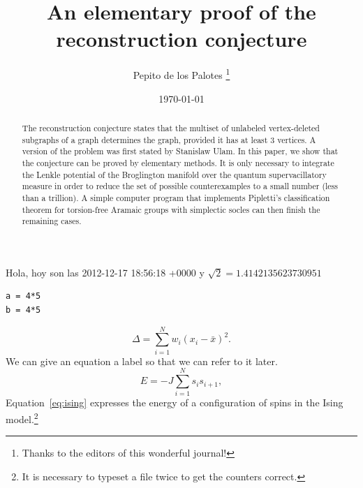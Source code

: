 \documentclass[12pt]{article}
\title{An elementary proof of the reconstruction conjecture}
\author{
Pepito de los Palotes
\thanks{Thanks to the editors of this wonderful journal!}
\\
}
\date{
\today
}
\begin{document}
\maketitle
\begin{abstract}
 The reconstruction conjecture states that the multiset of unlabeled
    vertex-deleted subgraphs of a graph determines the graph, provided it
    has at least 3 vertices.  A version of the problem was first stated
    by Stanislaw Ulam.  In this paper, we show that the conjecture can
    be proved by elementary methods.  It is only necessary to integrate
    the Lenkle potential of the Broglington manifold over the quantum
    supervacillatory measure in order to reduce the set of possible
    counterexamples to a small number (less than a trillion).  A simple
    computer program that implements Pipletti's classification theorem
    for torsion-free Aramaic groups with simplectic socles can then
    finish the remaining cases.  
\end{abstract}
Hola, hoy son las 2012-12-17 18:56:18 +0000 y $\sqrt{2} = 1.4142135623730951$
\begin{verbatim}
a = 4*5
b = 4*5
\end{verbatim}
\begin{equation}
\Delta =\sum_{i=1}^N w_i (x_i - \bar{x})^2.
\end{equation}
We can give an equation a label so that we can refer to it later.
\begin{equation}
\label{eq:ising}
E = -J \sum_{i=1}^N s_i s_{i+1},
\end{equation}
Equation~\eqref{eq:ising} expresses the energy of a configuration
  of spins in the Ising model.\footnote{It is necessary to typeset a
  file twice to get the counters correct.}
  
\end{document}
